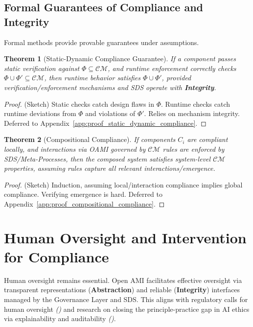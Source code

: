 \documentclass[12pt,a4paper]{report}
\renewcommand{\citep}[1]{\textit{\scriptsize{(\cite{#1})}}}
\newtheorem{theorem}{Theorem}[section]
\newcommand{\Integrity}{\textbf{Integrity}}
\newcommand{\Abstraction}{\textbf{Abstraction}}
\begin{document}
	\subsection{Formal Guarantees of Compliance and Integrity} %
	\label{sec:5-6-3} %
	
	Formal methods provide provable guarantees under assumptions.
	\begin{theorem}[Static-Dynamic Compliance Guarantee]
		\label{thm:static_dynamic_compliance}
		If a component passes static verification against $\Phi \subseteq \mathcal{CM}$, and runtime enforcement correctly checks $\Phi \cup \Phi' \subseteq \mathcal{CM}$, then runtime behavior satisfies $\Phi \cup \Phi'$, provided verification/enforcement mechanisms and SDS operate with \Integrity.
	\end{theorem}
	\begin{proof} (Sketch) Static checks catch design flaws in $\Phi$. Runtime checks catch runtime deviations from $\Phi$ and violations of $\Phi'$. Relies on mechanism integrity. Deferred to Appendix~\ref{app:proof_static_dynamic_compliance}. \end{proof}
	
	\begin{theorem}[Compositional Compliance]
		\label{thm:compositional_compliance}
		If components $C_i$ are compliant locally, and interactions via OAMI governed by $\mathcal{CM}$ rules are enforced by SDS/Meta-Processes, then the composed system satisfies system-level $\mathcal{CM}$ properties, assuming rules capture all relevant interactions/emergence.
	\end{theorem}
	\begin{proof} (Sketch) Induction, assuming local/interaction compliance implies global compliance. Verifying emergence is hard. Deferred to Appendix~\ref{app:proof_compositional_compliance}. \end{proof}
	
	\section{Human Oversight and Intervention for Compliance} %
	\label{sec:5-7} %
	
	Human oversight remains essential. Open AMI facilitates effective oversight via transparent representations (\Abstraction) and reliable (\Integrity) interfaces managed by the Governance Layer and SDS. This aligns with regulatory calls for human oversight \citep{EUAIAct2024} and research on closing the principle-practice gap in AI ethics via explainability and auditability \citep{Crossing_Principle_Practice_Gap_2024}.
	
\end{document}
